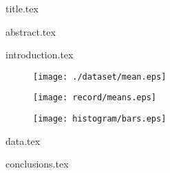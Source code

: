 \documentclass[titlepage]{article}
\begin{document}
{title.tex}

{abstract.tex}   %

{introduction.tex}   %

\begin{figure}
    \texttt{[image: ./dataset/mean.eps]}
    \caption{\protect}
\end{figure}

\begin{figure}
    \texttt{[image: record/means.eps]}
    \caption{\protect}
\end{figure}

\begin{figure}
    \texttt{[image: histogram/bars.eps]}
    \caption{\protect}
\end{figure}

{data.tex}   %

{conclusions.tex}   %
\end{document}

